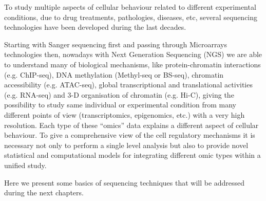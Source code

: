 To study multiple aspects of cellular behaviour related to different experimental conditions, due to drug treatments, pathologies, diseases, etc, several sequencing technologies have been developed during the last decades.

Starting with Sanger sequencing first and passing through Microarrays technologies then, nowadays with Next Generation Sequencing (NGS) we are able to understand many of biological mechanisms, like protein-chromatin interactions (e.g. ChIP-seq), DNA methylation (Methyl-seq or BS-seq), chromatin accessibility (e.g. ATAC-seq), global transcriptional and translational activities (e.g. RNA-seq) and 3-D organisation of chromatin (e.g. Hi-C), giving the possibility to study same individual or experimental condition from many different points of view (transcriptomics, epigenomics, etc.) with a very high resolution. Each type of these “omics” data explains a different aspect of cellular behaviour. To give a comprehensive view of the cell regulatory mechanisms it is necessary not only to perform a single level analysis but also to provide novel statistical and computational models for integrating different omic types within a unified study.

Here we present some basics of sequencing techniques that will be addressed during the next chapters.  
